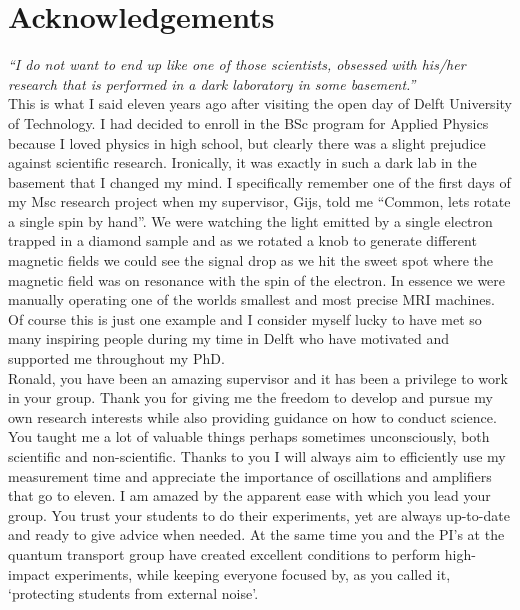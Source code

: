 %
\chapter{Acknowledgements}

\textit{``I do not want to end up like one of those scientists, obsessed with his/her research that is performed in a dark laboratory in some basement.''}
\\

This is what I said eleven years ago after visiting the open day of Delft University of Technology. I had decided to enroll in the BSc program for Applied Physics because I loved physics in high school, but clearly there was a slight prejudice against scientific research. Ironically, it was exactly in such a dark lab in the basement that I changed my mind. I specifically remember one of the first days of my Msc research project when my supervisor, Gijs, told me  ``Common, lets rotate a single spin by hand''. We were watching the light emitted by a single electron trapped in a diamond sample and as we rotated a knob to generate different magnetic fields we could see the signal drop as we hit the sweet spot where the magnetic field was on resonance with the spin of the electron. In essence we were manually operating one of the worlds smallest and most precise MRI machines.
Of course this is just one example and I consider myself lucky to have met so many inspiring people during my time in Delft who have motivated and supported me throughout my PhD.\\

Ronald, you have been an amazing supervisor and it has been a privilege to work in your group. Thank you for giving me the freedom to develop and pursue my own research interests while also providing guidance on how to conduct science. You taught me a lot of valuable things perhaps sometimes unconsciously, both scientific and non-scientific. Thanks to you I will always aim to efficiently use my measurement time and appreciate the importance of oscillations and amplifiers that go to eleven. I am amazed by the apparent ease with which you lead your group. You trust your students to do their experiments, yet are always up-to-date and ready to give advice when needed. At the same time you and the PI's at the quantum transport group have created excellent conditions to perform high-impact experiments, while keeping everyone focused by, as you called it, `protecting students from external noise'. \\


